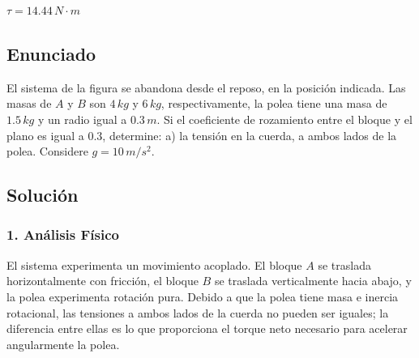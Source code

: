 \documentclass[12pt, a4paper]{article}
\begin{document}
\begin{tcolorbox}[colback=green!5!white, colframe=green!50!black, title=Respuesta Final]
\centering \Large $\tau = 14.44 \, \si{N\cdot m}$
\end{tcolorbox}

\newpage

\subsection*{Enunciado}
El sistema de la figura se abandona desde el reposo, en la posición indicada. Las masas de $A$ y $B$ son $4 \, \si{kg}$ y $6 \, \si{kg}$, respectivamente, la polea tiene una masa de $1.5 \, \si{kg}$ y un radio igual a $0.3 \, \si{m}$. Si el coeficiente de rozamiento entre el bloque y el plano es igual a $0.3$, determine:
a) la tensión en la cuerda, a ambos lados de la polea.
Considere $g = 10 \, \si{m/s^2}$.

\begin{center}
\end{center}

\subsection*{Solución}

\subsubsection*{1. Análisis Físico}
El sistema experimenta un movimiento acoplado. El bloque $A$ se traslada horizontalmente con fricción, el bloque $B$ se traslada verticalmente hacia abajo, y la polea experimenta rotación pura. Debido a que la polea tiene masa e inercia rotacional, las tensiones a ambos lados de la cuerda no pueden ser iguales; la diferencia entre ellas es lo que proporciona el torque neto necesario para acelerar angularmente la polea.
\end{document}
